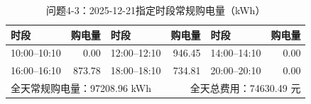 \begin{table}[H]\centering\small
\caption{问题4-3：2025-12-21指定时段常规购电量（kWh）}
\label{tab:q4_3_1221_purchase}
\begin{tabular}{lrlrlr}\toprule
时段 & 购电量 & 时段 & 购电量 & 时段 & 购电量 \\\midrule
10:00--10:10 & 0.00 & 12:00--12:10 & 946.45 & 14:00--14:10 & 0.00 \\
16:00--16:10 & 873.78 & 18:00--18:10 & 734.81 & 20:00--20:10 & 0.00 \\
\midrule
\multicolumn{3}{l}{全天常规购电量：97208.96 kWh} & \multicolumn{3}{r}{全天总费用：74630.49 元}\\
\bottomrule\end{tabular}\end{table}
